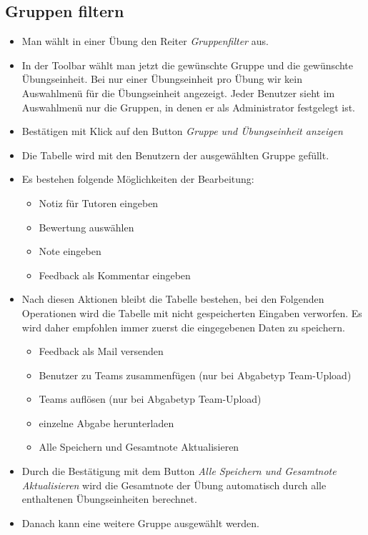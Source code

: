 \subsection*{Gruppen filtern}
\begin{itemize}
	\item Man wählt in einer Übung den Reiter \textit{Gruppenfilter} aus.
	\item In der Toolbar wählt man jetzt die gewünschte Gruppe und die gewünschte Übungseinheit. Bei nur einer Übungseinheit pro Übung wir kein Auswahlmenü für die Übungseinheit angezeigt. Jeder Benutzer sieht im Auswahlmenü nur die Gruppen, in denen er als Administrator festgelegt ist.
	\item Bestätigen mit Klick auf den Button \textit{Gruppe und Übungseinheit anzeigen}
	\item Die Tabelle wird mit den Benutzern der ausgewählten Gruppe gefüllt.
	\item Es bestehen folgende Möglichkeiten der Bearbeitung: 
	\begin{itemize}
		\item Notiz für Tutoren eingeben
		\item Bewertung auswählen
		\item Note eingeben
		\item Feedback als Kommentar eingeben
		
	\end{itemize}
	\item Nach diesen Aktionen bleibt die Tabelle bestehen, bei den Folgenden Operationen wird die Tabelle mit nicht gespeicherten Eingaben verworfen. Es wird daher empfohlen immer zuerst die eingegebenen Daten zu speichern.
	\begin{itemize}
		\item Feedback als Mail versenden
		\item Benutzer zu Teams zusammenfügen (nur bei Abgabetyp Team-Upload)
		\item Teams auflösen (nur bei Abgabetyp Team-Upload)
		\item einzelne Abgabe herunterladen
		\item Alle Speichern und Gesamtnote Aktualisieren
	\end{itemize}
	\item Durch die Bestätigung mit dem Button \textit{Alle Speichern und Gesamtnote Aktualisieren} wird die Gesamtnote der Übung automatisch durch alle enthaltenen Übungseinheiten berechnet.
	\item Danach kann eine weitere Gruppe ausgewählt werden.
\end{itemize}

\clearpage